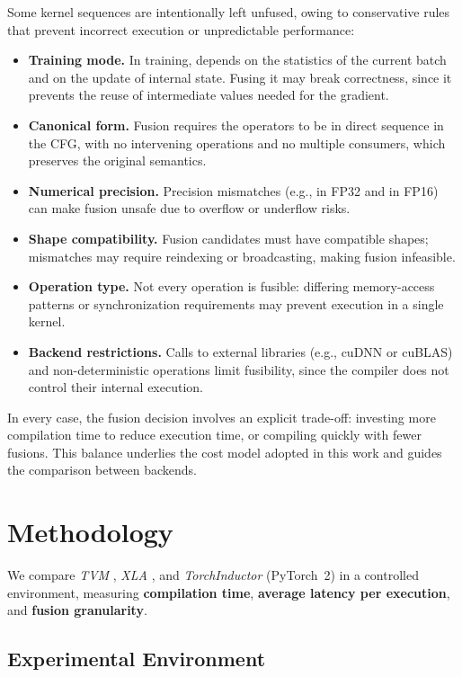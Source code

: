 \documentclass[sigconf,anonymous]{acmart}
\newcommand{\tcode}[1]{\texttt{\seqsplit{#1}}}
\begin{document}
Some kernel sequences are intentionally left unfused, owing to conservative rules that prevent incorrect execution or unpredictable performance:
\begin{itemize}
    \item \textbf{Training mode.} In training, \tcode{BatchNorm} depends on the statistics of the current batch and on the update of internal state. Fusing it may break correctness, since it prevents the reuse of intermediate values needed for the gradient.
    \item \textbf{Canonical form.} Fusion requires the operators to be in direct sequence in the CFG, with no intervening operations and no multiple consumers, which preserves the original semantics.
    \item \textbf{Numerical precision.} Precision mismatches (e.g., \tcode{BatchNorm} in FP32 and \tcode{ReLU} in FP16) can make fusion unsafe due to overflow or underflow risks.
    \item \textbf{Shape compatibility.} Fusion candidates must have compatible shapes; mismatches may require reindexing or broadcasting, making fusion infeasible.
    \item \textbf{Operation type.} Not every operation is fusible: differing memory-access patterns or synchronization requirements may prevent execution in a single kernel.
    \item \textbf{Backend restrictions.} Calls to external libraries (e.g., cuDNN or cuBLAS) and non-deterministic operations limit fusibility, since the compiler does not control their internal execution.
\end{itemize}
In every case, the fusion decision involves an explicit trade-off: investing more compilation time to reduce execution time, or compiling quickly with fewer fusions. This balance underlies the cost model adopted in this work and guides the comparison between backends.

\section{Methodology}
\label{sec:methodology}

We compare \textit{TVM} \cite{chen2018tvm}, \textit{XLA} \cite{snider2023xla}, and \textit{TorchInductor} (PyTorch~2) \cite{pytorch2022} in a controlled environment, measuring \textbf{compilation time}, \textbf{average latency per execution}, and \textbf{fusion granularity}.

\subsection{Experimental Environment}
\end{document}
